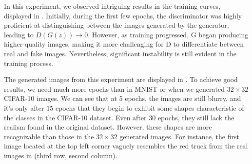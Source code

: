 In this experiment, we observed intriguing results in the training curves, displayed in . Initially, during the first few epochs, the discriminator was highly proficient at distinguishing between the images generated by the generator, leading to $D(G(z)) \rightarrow 0$. However, as training progressed, G began producing higher-quality images, making it more challenging for D to differentiate between real and fake images. Nevertheless, significant instability is still evident in the training process.

The generated images from this experiment are displayed in . To achieve good results, we need much more epochs than in MNIST or when we generated $32 \times 32$ CIFAR-10 images. We can see that at 5 epochs, the images are still blurry, and it's only after 15 epochs that they begin to exhibit some shapes characteristic of the classes in the CIFAR-10 dataset. Even after 30 epochs, they still lack the realism found in the original dataset. However, these shapes are more recognizable than those in the $32 \times 32$ generated images. For instance, the first image located at the top left corner vaguely resembles the red truck from the real images in  (third row, second column).

